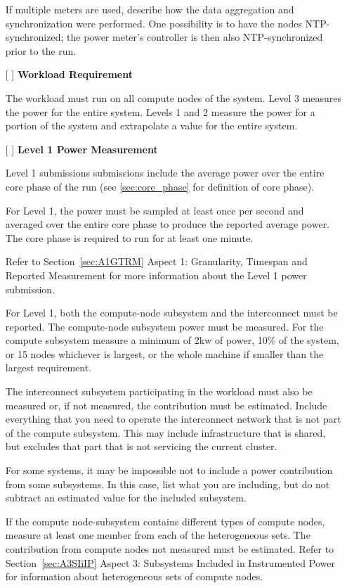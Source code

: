 \begin{itemize}
If multiple meters are used, describe how the data aggregation and synchronization were performed. One possibility is to have the nodes NTP-synchronized; the power meter's controller is then also NTP-synchronized prior to the run.

\item[{[ ]}]
\textbf{Workload Requirement}

The workload must run on all compute nodes of the system. Level 3 measures the power for the entire system. Levels 1 and 2 measure the power for a portion of the system and extrapolate a value for the entire system. 

\item[{[ ]}]
\textbf{Level 1 Power Measurement}

Level 1 submissions submissions include the average power over the entire core phase of the run (see \ref{sec:core_phase} for definition of core phase).

For Level 1, the power must be sampled at least once per second and averaged over the entire core phase to produce the reported average power.
The core phase is required to run for at least one minute.

Refer to Section~\ref{sec:A1GTRM} Aspect 1: Granularity, Timespan and Reported Measurement for more information about the
Level 1 power submission.

For Level 1, both the compute-node subsystem and the interconnect must be reported.  
The compute-node subsystem power must be measured. 
For the compute subsystem measure a minimum of 2kw of power, 
10\% of the system, or 15  nodes whichever is largest, or the whole machine if smaller than the largest requirement.

The interconnect subsystem participating in the workload must also be measured or, if not measured, the contribution must be estimated.
Include everything that you need to operate the interconnect network that is not part of the compute subsystem. 
This may include infrastructure that is shared, but excludes that part that is not servicing the current cluster.

For some systems, it may be impossible not to include a power contribution from some subsystems. 
In this case, list what you are including, but do not subtract an estimated value for the included subsystem.

If the compute node-subsystem contains different types of compute nodes, measure at least one member from each of the heterogeneous sets. The contribution from compute nodes not measured must be estimated. Refer to 
Section~\ref{sec:A3SIiIP} Aspect 3: Subsystems Included in Instrumented Power for information about
 heterogeneous sets of compute nodes.


\end{itemize}
